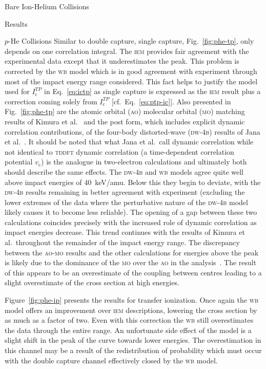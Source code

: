 \documentclass[letterpaper, 11 pt]{report}
\begin{document}
\begin{chapter}{Bare Ion-Helium Collisions \label{chap:p-he2p-he}}
\begin{section}{Results \label{sec:phe2p-res}}
\begin{subsection}{\texorpdfstring{$p$}{p}-He Collisions \label{sec:phe-res}}
         Similar to double capture, single capture, Fig.~\ref{fig:phe-tp}, only depends on one
         correlation integral. The \textsc{iem} provides fair agreement with the experimental data
         except that it underestimates the peak. This problem is corrected by the \textsc{wb} model
         which is in good agreement with experiment through most of the impact energy range considered.
         This fact helps to justify the model used for $I^{TP}_\mathrm{c}$ in Eq.~\eqref{eq:ictp} as
         single capture is expressed as the \textsc{iem} result plus a correction coming solely from
         $I^{TP}_\mathrm{c}$ [cf.\ Eq.~\eqref{eq:ptp-ic}]. Also presented in Fig.~\ref{fig:phe-tp} are
         the atomic orbital (\textsc{ao}) molecular orbital (\textsc{mo}) matching results of Kimura et
         al.~\cite{KL-86} and the post form, which includes explicit dynamic correlation contributions,
         of the four-body distorted-wave (\textsc{dw-4b}) results of Jana et al.~\cite{JMP-15}. It
         should be noted that what Jana et al.\ call dynamic correlation while not identical to
         \textsc{tddft} dynamic correlation (a time-dependent correlation potential $v_\mathrm{c}$) is
         the analogue in two-electron calculations and ultimately both should describe the same effects.
         The \textsc{dw-4b} and \textsc{wb} models agree quite well above impact energies of 40~keV/amu.
         Below this they begin to deviate, with the \textsc{dw-4b} results remaining in better agreement
         with experiment (excluding the lower extremes of the data where the perturbative nature of the
         \textsc{dw-4b} model likely causes it to become less reliable). The opening of a gap between
         these two calculations coincides precisely with the increased role of dynamic correlation as
         impact energies decrease. This trend continues with the results of Kimura et al.\ throughout
         the remainder of the impact energy range. The discrepancy between the \textsc{ao-mo} results
         and the other calculations for energies above the peak is likely due to the dominance of the
         \textsc{mo} over the \textsc{ao} in the analysis~\cite{KL-86}. The result of this appears to be
         an overestimate of the coupling between centres leading to a slight overestimate of the cross
         section at high energies.

         Figure~\ref{fig:phe-ip} presents the results for transfer ionization. Once again the
         \textsc{wb} model offers an improvement over \textsc{iem} descriptions, lowering the cross
         section by as much as a factor of two. Even with this correction the \textsc{wb} still
         overestimates the data through the entire range. An unfortunate side effect of the model is a
         slight shift in the peak of the curve towards lower energies. The overestimation in this
         channel may be a result of the redistribution of probability which must occur with the double
         capture channel effectively closed by the \textsc{wb} model.


\end{subsection}
\end{section}
\end{chapter}
\end{document}
